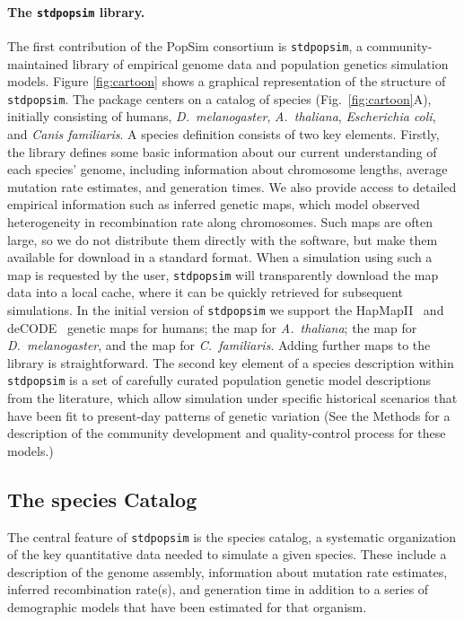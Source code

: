 \documentclass[12pt,halfline,a4paper]{ouparticle}
\newcommand{\stdpopsim}{\texttt{stdpopsim}\xspace}
\begin{document}
\paragraph{The \stdpopsim library.}
The first contribution of the PopSim consortium is \stdpopsim, a
community-maintained library of empirical genome data and population genetics simulation
models. Figure \ref{fig:cartoon} shows a graphical
representation of the structure of \stdpopsim. The package centers
on a catalog of species (Fig.~\ref{fig:cartoon}A), initially consisting of humans,
\textit{D.~melanogaster}, \textit{A.~thaliana},
\textit{Escherichia coli}, and \textit{Canis familiaris}.
A species definition consists of two key elements.
Firstly, the library defines some basic information about our current understanding of each
species' genome, including information about chromosome
lengths, average mutation rate estimates, and generation times.
We also provide access to detailed empirical information such as inferred genetic maps,
which model observed heterogeneity in recombination rate along chromosomes.
Such maps are often large,
so we do not distribute them directly with the software, but make them available
for download in a standard format.
When a simulation using such a map is requested by the user,
\stdpopsim will transparently download the map data into a local cache,
where it can be quickly retrieved for subsequent simulations.
In the initial version of \stdpopsim we support
the HapMapII~\citep{international2007second} and
deCODE~\citep{kong2010fine} genetic maps for humans;
the \cite{salome2011recombination} map for \textit{A.~thaliana};
the \cite{comeron2012many} map for \textit{D.~melanogaster},
and the \cite{campbell2016pedigree} map for \textit{C.~familiaris}.
Adding further maps to the library is straightforward.
The second key element of a species description
within \stdpopsim is a set of carefully curated population genetic model
descriptions from the literature, which allow simulation under
specific historical scenarios that have been fit to present-day patterns of
genetic variation (See the Methods for a description of the community
development and quality-control process for these models.)


\subsection*{The species Catalog}
The central feature of \stdpopsim is the species catalog, a systematic organization
of the key quantitative data needed to simulate a given species. These include a description
of the genome assembly, information about mutation rate estimates, inferred recombination rate(s), and generation time
in addition to a series of demographic models that have been estimated for that organism.
\end{document}

